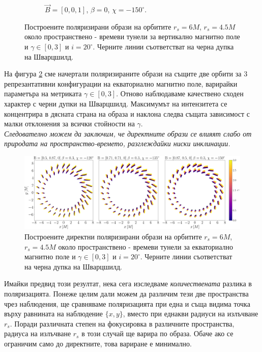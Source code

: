 \begin{figure}[!htb]
\begin{subfigure}{6cm}
		\caption{$\vec{B} = [0, 0, 1]$, $\beta = 0$, $\chi = -150^\circ$.}
	\end{subfigure}
	\caption[Поляризирани образи около пространствено - времеви тунели за вертикално магнитно поле.]{\small Построените поляризирани образи на орбитите $r_s = 6M$, $r_s = 4.5M$ около пространствено - времеви тунели за вертикално магнитно поле и $\gamma \in[0,3]$ и $i = 20^\circ$. Черните линии съответстват на черна дупка на Шварцшилд.} 
	\label{WH_pol_vert_field}
\end{figure}

На фигура \ref{WH_pol_eq_field} сме начертали поляризираните образи на същите две орбити за 3 репрезантативни конфигурации на екваториално магнитно поле, варирайки параметъра на метриката $\gamma \in[0,3]$. Отново наблюдаваме качествено сходен характер с черни дупки на Шварцшилд. Максимумът на интензитета се концентрира в дясната страна на образа и наклона следва същата зависимост с малки отклонения за всички стойности на $\gamma$. \\

\emph{Следователно можем да заключим, че директните образи се влияят слабо от природата на пространство-времето, разглеждайки ниски инклинации.}

\begin{figure}[!htb]
	\hspace{-0.7cm}
	\includegraphics[scale = 0.2]{WH_alpha_Eq_Field.png}
	\caption[Поляризирани директни образи около пространствено - времеви тунели за екваториално магнитно поле.]{\small Построените директни поляризирани образи на орбитите $r_s = 6M$, $r_s = 4.5M$ около пространствено - времеви тунели за екваториално магнитно поле и $\gamma \in[0,3]$ и $i = 20^\circ$. Черните линии съответстват на черна дупка на Шварцшилд.} 
	\label{WH_pol_eq_field}
\end{figure}

\newpage

Имайки предвид този резултат, нека сега изследваме \emph{количествената} разлика в поляризацията. Понеже целим дали можем да различим тези две пространства чрез наблюдения, ще сравняваме поляризацията при една и съща видима точка върху равнината на наблюдение $\{x,y\}$, вместо при еднакви радиуси на излъчване $r_s$. Поради различната степен на фокусировка в различните пространства, радиуса на излъчване $r_s$ в този случай ще варира по образа. Обаче ако се ограничим само до директните, това вариране е минимално.\\


